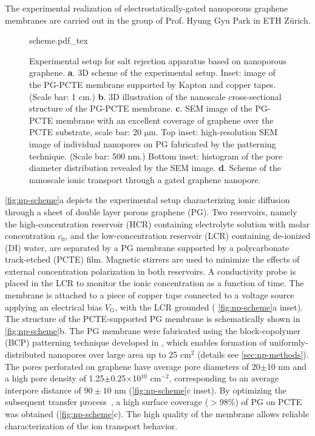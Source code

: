 The experimental realization of electrostatically-gated nanoporous
graphene membranes are carried out in the group of Prof. Hyung Gyu
Park in ETH Zürich.

\begin{figure}[!htbp]
  \centering
  {scheme.pdf_tex}
  \caption{Experimental setup for salt rejection apparatus based on
    nanoporous graphene.  \textbf{a}. 3D scheme of the experimental
    setup. Inset: image of the PG-PCTE membrane supported by Kapton
    and copper tapes. (Scale bar: 1 cm.)  \textbf{b}. 3D illustration
    of the nanoscale cross-sectional structure of the PG-PCTE
    membrane. \textbf{c}. SEM image of the PG-PCTE membrane with an
    excellent coverage of graphene over the PCTE substrate, scale bar:
    20 $\mathrm{\mu}$m.  Top inset: high-resolution SEM image of
    individual nanopores on PG fabricated by the patterning
    technique. (Scale bar: 500 nm.)  Bottom inset: histogram of
    the pore diameter distribution revealed by the SEM
    image. \textbf{d}. Scheme of the nanoscale ionic transport
    through a gated graphene nanopore.}
  \label{fig:np-scheme}
\end{figure}

%
 \autoref{fig:np-scheme}a depicts the experimental setup characterizing
ionic diffusion through a sheet of double layer porous graphene
(PG).
%
Two reservoirs, namely the high-concentration reservoir (HCR)
containing electrolyte solution with molar concentration $c_0$, and
the low-concentration reservoir (LCR) containing de-ionized (DI)
water, are separated by a PG membrane supported by a polycarbonate
track-etched (PCTE) film.
%
Magnetic stirrers are used to minimize the effects of external
concentration polarization in both reservoirs.
%
A conductivity
probe is placed in the LCR to monitor the ionic concentration as a
function of time. The membrane is attached to a piece of copper tape
connected to a voltage source applying an electrical bias
$V_{\mathrm{G}}$, with the LCR grounded ( \autoref{fig:np-scheme}a
inset).
%
The structure of the PCTE-supported PG membrane is schematically shown
in \autoref{fig:np-scheme}b. The PG membrane were fabricated using the
block-copolymer (BCP) patterning technique developed in
\autocite{Choi_2018_wafer_scale_gr}, which enables formation of
uniformly-distributed nanopores over large area up to 25 cm$^{2}$
(details see \autoref{sec:np-methods}).
%
The pores perforated on graphene have average pore diameters of
20$\pm$10 nm and a high pore density of 1.25$\pm$0.25$\times$10$^{10}$
cm$^{-2}$, corresponding to an average inter\-pore distance of
$90\pm10$ nm  (\autoref{fig:np-scheme}c inset).
%
By optimizing the subsequent transfer
process~\autocite{Choi_2018_wafer_scale_gr}, a high surface coverage
($>$98\%) of PG on PCTE was obtained (\autoref{fig:np-scheme}c).
The high quality of the membrane allows
reliable characterization of the ion transport behavior.
%


